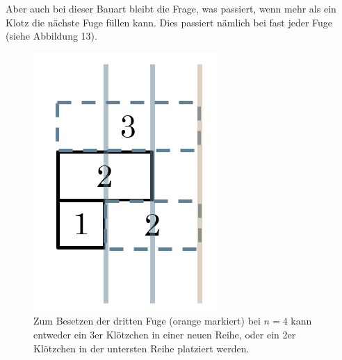 \documentclass[a4paper,12pt]{article}
\begin{document}
Aber auch bei dieser Bauart bleibt die Frage, was passiert, wenn mehr als ein Klotz die nächste Fuge füllen kann. Dies passiert nämlich bei fast jeder Fuge (siehe Abbildung 13).
\begin{figure}[H]
    \centering
    \includegraphics[width=0.35\linewidth]{Bilder/Aufgabe1/Problem_Mauerbauart_02_Mehrere_Kloetze.png}
    \caption{Zum Besetzen der dritten Fuge (orange markiert) bei $n = 4$ kann entweder ein 3er Klötzchen in einer neuen Reihe, oder ein 2er Klötzchen in der untersten Reihe platziert werden.}
\end{figure}
\end{document}
